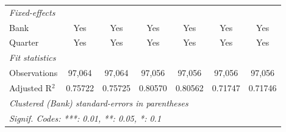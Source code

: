 \begin{tabular}{lcccccc}
   \midrule
   \emph{Fixed-effects}\\
   Bank                           & Yes           & Yes           & Yes            & Yes            & Yes             & Yes\\  
   Quarter                        & Yes           & Yes           & Yes            & Yes            & Yes             & Yes\\  
   \midrule
   \emph{Fit statistics}\\
   Observations                   & 97,064        & 97,064        & 97,056         & 97,056         & 97,056          & 97,056\\  
   Adjusted R$^2$                 & 0.75722       & 0.75725       & 0.80570        & 0.80562        & 0.71747         & 0.71746\\  
   \midrule \midrule
   \multicolumn{7}{l}{\emph{Clustered (Bank) standard-errors in parentheses}}\\
   \multicolumn{7}{l}{\emph{Signif. Codes: ***: 0.01, **: 0.05, *: 0.1}}\\
\end{tabular}
\par\endgroup


